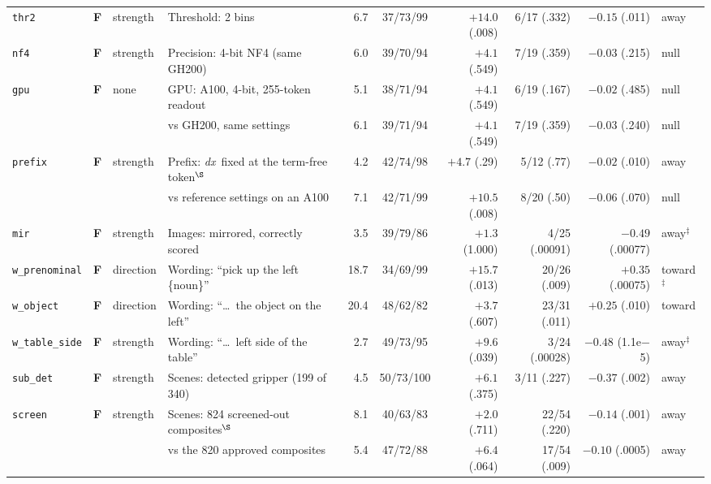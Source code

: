 \documentclass[conference]{IEEEtran}
\newcommand{\dx}{\textit{dx}}
\newcommand{\rowid}[1]{\texttt{#1}}
\newcommand{\frk}{\textcolor{forkc}{\textbf{F}}}
\begin{document}
\begin{table}[t]
\begin{tabular}{@{}l c l l r c r r r l@{}}
\rowid{thr2} & \frk & strength & Threshold: 2 bins & 6.7 & 37/73/99 & $+14.0$ (.008) & 6/17 (.332) & $-0.15$ (.011) & away\\
\rowid{nf4} & \frk & strength & Precision: 4-bit NF4 (same GH200) & 6.0 & 39/70/94 & $+4.1$ (.549) & 7/19 (.359) & $-0.03$ (.215) & null\\
\rowid{gpu} & \frk & none & GPU: A100, 4-bit, 255-token readout & 5.1 & 38/71/94 & $+4.1$ (.549) & 6/19 (.167) & $-0.02$ (.485) & null\\
 & & & \quad vs GH200, same settings & 6.1 & 39/71/94 & $+4.1$ (.549) & 7/19 (.359) & $-0.03$ (.240) & null\\
\rowid{prefix} & \frk & strength & Prefix: \dx\ fixed at the term-free token$^\S$ & 4.2 & 42/74/98 & $+4.7$ (.29) & 5/12 (.77) & $-0.02$ (.010) & away\\
 & & & \quad vs reference settings on an A100 & 7.1 & 42/71/99 & $+10.5$ (.008) & 8/20 (.50) & $-0.06$ (.070) & null\\
\rowid{mir} & \frk & strength & Images: mirrored, correctly scored & 3.5 & 39/79/86 & $+1.3$ (1.000) & 4/25 (.00091) & $-0.49$ (.00077) & away$^\ddagger$\\
\rowid{w\_prenominal} & \frk & direction & Wording: ``pick up the left \{noun\}'' & 18.7 & 34/69/99 & $+15.7$ (.013) & 20/26 (.009) & $+0.35$ (.00075) & toward$^\ddagger$\\
\rowid{w\_object} & \frk & direction & Wording: ``\dots\ the object on the left'' & 20.4 & 48/62/82 & $+3.7$ (.607) & 23/31 (.011) & $+0.25$ (.010) & toward\\
\rowid{w\_table\_side} & \frk & strength & Wording: ``\dots\ left side of the table'' & 2.7 & 49/73/95 & $+9.6$ (.039) & 3/24 (.00028) & $-0.48$ (1.1e$-$5) & away$^\ddagger$\\
\rowid{sub\_det} & \frk & strength & Scenes: detected gripper (199 of 340) & 4.5 & 50/73/100 & $+6.1$ (.375) & 3/11 (.227) & $-0.37$ (.002) & away\\
\rowid{screen} & \frk & strength & Scenes: 824 screened-out composites$^\S$ & 8.1 & 40/63/83 & $+2.0$ (.711) & 22/54 (.220) & $-0.14$ (.001) & away\\
 & & & \quad vs the 820 approved composites & 5.4 & 47/72/88 & $+6.4$ (.064) & 17/54 (.009) & $-0.10$ (.0005) & away\\
\bottomrule
\end{tabular}
\end{table}

\end{document}
